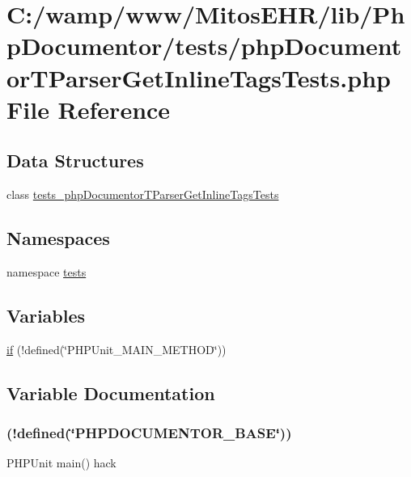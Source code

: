 \hypertarget{php_documentor_t_parser_get_inline_tags_tests_8php}{\section{\-C\-:/wamp/www/\-Mitos\-E\-H\-R/lib/\-Php\-Documentor/tests/php\-Documentor\-T\-Parser\-Get\-Inline\-Tags\-Tests.php \-File \-Reference}
\label{php_documentor_t_parser_get_inline_tags_tests_8php}
}
\subsection*{\-Data \-Structures}
\begin{DoxyCompactItemize}
\item 
class \hyperlink{classtests__php_documentor_t_parser_get_inline_tags_tests}{tests\-\_\-php\-Documentor\-T\-Parser\-Get\-Inline\-Tags\-Tests}
\end{DoxyCompactItemize}
\subsection*{\-Namespaces}
\begin{DoxyCompactItemize}
\item 
namespace \hyperlink{namespacetests}{tests}
\end{DoxyCompactItemize}
\subsection*{\-Variables}
\begin{DoxyCompactItemize}
\item 
\hyperlink{php_documentor_t_parser_get_inline_tags_tests_8php_ae3cacee49c3c7d622bb92397daeb7733}{if} (!defined(\char`\"{}\-P\-H\-P\-Unit\-\_\-\-M\-A\-I\-N\-\_\-\-M\-E\-T\-H\-O\-D\char`\"{}))
\end{DoxyCompactItemize}


\subsection{\-Variable \-Documentation}
\hypertarget{php_documentor_t_parser_get_inline_tags_tests_8php_ae3cacee49c3c7d622bb92397daeb7733}{
\subsubsection[{if}]{(!defined(\char`\"{}\-P\-H\-P\-D\-O\-C\-U\-M\-E\-N\-T\-O\-R\-\_\-\-B\-A\-S\-E\char`\"{}))}}\label{php_documentor_t_parser_get_inline_tags_tests_8php_ae3cacee49c3c7d622bb92397daeb7733}
\-P\-H\-P\-Unit main() hack

